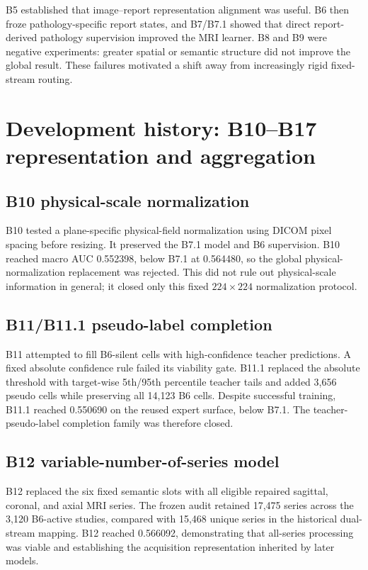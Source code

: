 \documentclass[preprint,12pt]{elsarticle}
\begin{document}
B5 established that image--report representation alignment was useful. B6 then froze pathology-specific report states, and B7/B7.1 showed that direct report-derived pathology supervision improved the MRI learner. B8 and B9 were negative experiments: greater spatial or semantic structure did not improve the global result. These failures motivated a shift away from increasingly rigid fixed-stream routing.

\section{Development history: B10--B17 representation and aggregation}
\label{sec:b10b17}

\subsection{B10 physical-scale normalization}
B10 tested a plane-specific physical-field normalization using DICOM pixel spacing before resizing. It preserved the B7.1 model and B6 supervision. B10 reached macro AUC 0.552398, below B7.1 at 0.564480, so the global physical-normalization replacement was rejected. This did not rule out physical-scale information in general; it closed only this fixed $224\times224$ normalization protocol.

\subsection{B11/B11.1 pseudo-label completion}
B11 attempted to fill B6-silent cells with high-confidence teacher predictions. A fixed absolute confidence rule failed its viability gate. B11.1 replaced the absolute threshold with target-wise 5th/95th percentile teacher tails and added 3,656 pseudo cells while preserving all 14,123 B6 cells. Despite successful training, B11.1 reached 0.550690 on the reused expert surface, below B7.1. The teacher-pseudo-label completion family was therefore closed.

\subsection{B12 variable-number-of-series model}
B12 replaced the six fixed semantic slots with all eligible repaired sagittal, coronal, and axial MRI series. The frozen audit retained 17,475 series across the 3,120 B6-active studies, compared with 15,468 unique series in the historical dual-stream mapping. B12 reached 0.566092, demonstrating that all-series processing was viable and establishing the acquisition representation inherited by later models.
\end{document}
